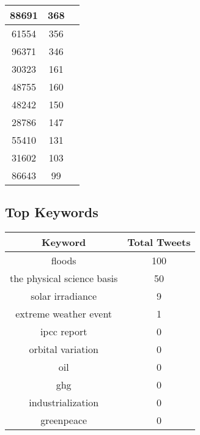 \documentclass{article}\usepackage[T1]{fontenc}
\begin{document}
\begin{tabular}{|c|c|c|}
 \hline
88691 & 368\\ 
 \hline
61554 & 356\\ 
 \hline
96371 & 346\\ 
 \hline
30323 & 161\\ 
 \hline
48755 & 160\\ 
 \hline
48242 & 150\\ 
 \hline
28786 & 147\\ 
 \hline
55410 & 131\\ 
 \hline
31602 & 103\\ 
 \hline
86643 & 99\\ 
 \hline
\end{tabular}\subsection*{Top Keywords}\begin{tabular}{|c|c|}         \hline         Keyword & Total Tweets \\ 
 \hline
floods & 100\\ 
 \hline
the physical science basis & 50\\ 
 \hline
solar irradiance & 9\\ 
 \hline
extreme weather event & 1\\ 
 \hline
ipcc report & 0\\ 
 \hline
orbital variation & 0\\ 
 \hline
oil & 0\\ 
 \hline
ghg & 0\\ 
 \hline
industrialization & 0\\ 
 \hline
greenpeace & 0\\ 
 \hline
\end{tabular}
\end{document}
